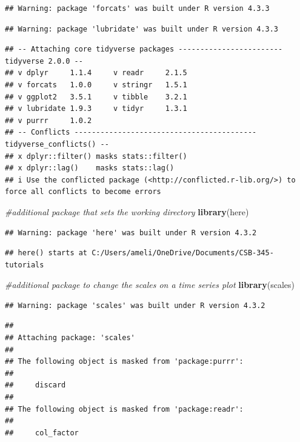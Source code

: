 \documentclass[
]{article}
\newenvironment{Shaded}{\begin{snugshade}}{\end{snugshade}}
\newcommand{\CommentTok}[1]{\textcolor[rgb]{0.56,0.35,0.01}{\textit{#1}}}
\newcommand{\FunctionTok}[1]{\textcolor[rgb]{0.13,0.29,0.53}{\textbf{#1}}}
\newcommand{\NormalTok}[1]{#1}
\begin{document}
\begin{verbatim}
## Warning: package 'forcats' was built under R version 4.3.3
\end{verbatim}

\begin{verbatim}
## Warning: package 'lubridate' was built under R version 4.3.3
\end{verbatim}

\begin{verbatim}
## -- Attaching core tidyverse packages ------------------------ tidyverse 2.0.0 --
## v dplyr     1.1.4     v readr     2.1.5
## v forcats   1.0.0     v stringr   1.5.1
## v ggplot2   3.5.1     v tibble    3.2.1
## v lubridate 1.9.3     v tidyr     1.3.1
## v purrr     1.0.2     
## -- Conflicts ------------------------------------------ tidyverse_conflicts() --
## x dplyr::filter() masks stats::filter()
## x dplyr::lag()    masks stats::lag()
## i Use the conflicted package (<http://conflicted.r-lib.org/>) to force all conflicts to become errors
\end{verbatim}

\begin{Shaded}
\begin{Highlighting}[]
\CommentTok{\#additional package that sets the working directory}
\FunctionTok{library}\NormalTok{(here)}
\end{Highlighting}
\end{Shaded}

\begin{verbatim}
## Warning: package 'here' was built under R version 4.3.2
\end{verbatim}

\begin{verbatim}
## here() starts at C:/Users/ameli/OneDrive/Documents/CSB-345-tutorials
\end{verbatim}

\begin{Shaded}
\begin{Highlighting}[]
\CommentTok{\#additional package to change the scales on a time series plot}
\FunctionTok{library}\NormalTok{(scales)}
\end{Highlighting}
\end{Shaded}

\begin{verbatim}
## Warning: package 'scales' was built under R version 4.3.2
\end{verbatim}

\begin{verbatim}
## 
## Attaching package: 'scales'
## 
## The following object is masked from 'package:purrr':
## 
##     discard
## 
## The following object is masked from 'package:readr':
## 
##     col_factor
\end{verbatim}
\end{document}
